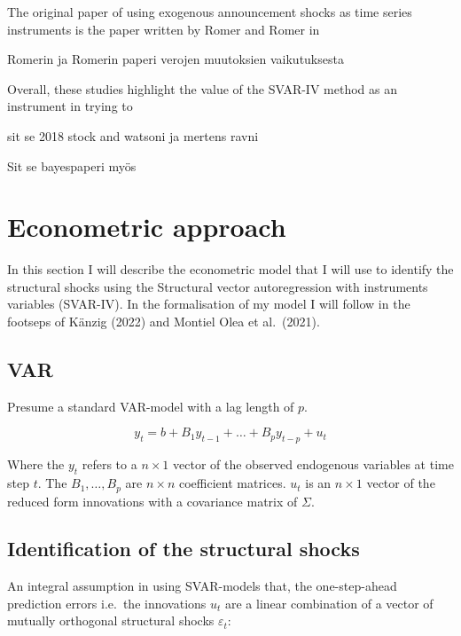 \documentclass[
  12pt,
  a4paper,
]{report}
\begin{document}
The original paper of using exogenous announcement shocks as time series instruments is the paper written by Romer and Romer in

Romerin ja Romerin paperi verojen muutoksien vaikutuksesta

Overall, these studies highlight the value of the SVAR-IV method as an instrument in trying to

sit se 2018 stock and watsoni ja mertens ravni

Sit se bayespaperi myös

\hypertarget{econometric-approach}{%
\chapter{Econometric approach}\label{econometric-approach}}

In this section I will describe the econometric model that I will use to identify the structural shocks using the Structural vector autoregression with instruments variables (SVAR-IV). In the formalisation of my model I will follow in the footseps of Känzig (2022) and Montiel Olea et al.~(2021).

\hypertarget{var}{%
\section{VAR}\label{var}}

Presume a standard VAR-model with a lag length of \(p\).

\begin{equation} 
y_t = b + B_1y_{t-1}+\dots+ B_py_{t-p}+ u_t
\label{eq:svar}
\end{equation}

Where the \(y_t\) refers to a \(n \times 1\) vector of the observed endogenous variables at time step \(t\). The \(B_1,\dots, B_p\) are \(n \times n\) coefficient matrices. \(u_t\) is an \(n \times 1\) vector of the reduced form innovations with a covariance matrix of \(\Sigma\).

\hypertarget{identification-of-the-structural-shocks}{%
\section{Identification of the structural shocks}\label{identification-of-the-structural-shocks}}

An integral assumption in using SVAR-models that, the one-step-ahead prediction errors i.e.~the innovations \(u_t\) are a linear combination of a vector of mutually orthogonal structural shocks \(\varepsilon_t\):
\end{document}
